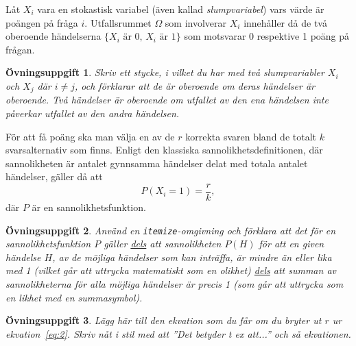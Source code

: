 \documentclass[12pt,a4wide]{article}
\theoremstyle{uppgiftsstil}
\newcommand{\ovningstext}{Övningsuppgift}
\newtheorem{ovning}{\ovningstext}
\newenvironment{uppgift}{\begin{framed}\begin{ovning}}%
                        {\end{ovning}\end{framed}}
\theoremstyle{avklaradstil}
\begin{document}
Låt $X_i$    %
vara en stokastisk variabel (även kallad \emph{slumpvariabel}) vars
värde är poängen på fråga $i$. Utfallsrummet $\Omega$  
som involverar $X_i$ innehåller då de två oberoende händelserna
$\{\text{$X_i$ är 0, $X_i$ är 1}\}$ 
som motsvarar 0 respektive 1 poäng på frågan.
%
\begin{uppgift}
  Skriv ett stycke, i vilket du har med två slumpvariabler $X_i$ och
  $X_j$ där $i \not= j$, och förklarar att de är oberoende om deras
  händelser är oberoende. Två händelser är oberoende om  utfallet av
  den ena händelsen inte påverkar utfallet av den andra händelsen.  
\end{uppgift}

För att få poäng ska man välja en av de $r$ korrekta svaren bland de
totalt $k$ svarsalternativ som finns. Enligt den klassiska
sannolikhetsdefinitionen, där sannolikheten är antalet gynnsamma
händelser delat med totala antalet händelser, gäller då att 
%
\begin{equation}             %
  \label{eq:2}               %
  P(X_i = 1) = \frac{r}{k},  %
\end{equation}               %
%
där $P$ är en sannolikhetsfunktion. 
%
\begin{uppgift}
  Använd en \texttt{itemize}-omgivning och förklara att det för en
  sannolikhetsfunktion $P$ gäller \underline{dels} att sannolikheten
  $P(H)$ för att en given händelse $H$, av de möjliga händelser som
  kan inträffa, är mindre än eller lika med 1 (vilket går att
  uttrycka matematiskt som en olikhet) \underline{dels} att summan av
  sannolikheterna för alla möjliga händelser är precis 1 (som går att
  uttrycka som en likhet med en summasymbol). 
\end{uppgift}
%
\begin{uppgift}
  Lägg här till den ekvation som du får om du bryter ut $r$ ur
  ekvation~\ref{eq:2}. Skriv nåt i stil med att ''Det betyder t ex
  att...'' och så ekvationen. 
\end{uppgift} 
\end{document}
